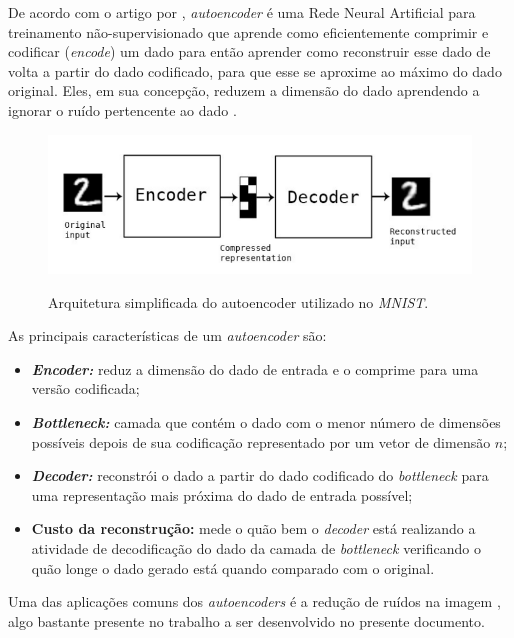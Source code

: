 De acordo com o artigo por , \textit{autoencoder} é uma Rede Neural Artificial para treinamento não-supervisionado que aprende como eficientemente comprimir e codificar (\textit{encode}) um dado para então aprender como reconstruir esse dado de volta a partir do dado codificado, para que esse se aproxime ao máximo do dado original. Eles, em sua concepção, reduzem a dimensão do dado aprendendo a ignorar o ruído pertencente ao dado \cite{intro-to-autoencoders}.

\begin{figure}[H]
  \centering
  \caption{Arquitetura simplificada do autoencoder utilizado no \textit{MNIST}.}
  \includegraphics[scale=0.6]{figuras/mnist-autoencoder.png}
  \label{fig:mnist-autoencoder}
\end{figure}

As principais características de um \textit{autoencoder} são:

\begin{itemize}
  \item \textbf{\textit{Encoder:}} reduz a dimensão do dado de entrada e o comprime para uma versão codificada;
  \item \textbf{\textit{Bottleneck:}} camada que contém o dado com o menor número de dimensões possíveis depois de sua codificação representado por um vetor de dimensão $n$;
  \item \textbf{\textit{Decoder:}} reconstrói o dado a partir do dado codificado do \textit{bottleneck} para uma representação mais próxima do dado de entrada possível;
  \item \textbf{Custo da reconstrução:} mede o quão bem o \textit{decoder} está realizando a atividade de decodificação do dado da camada de \textit{bottleneck} verificando o quão longe o dado gerado está quando comparado com o original.
\end{itemize}

Uma das aplicações comuns dos \textit{autoencoders} é a redução de ruídos na imagem \cite{intro-to-autoencoders}, algo bastante presente no trabalho a ser desenvolvido no presente documento.


